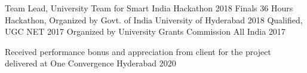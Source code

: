 \begin{cvhonors}
  \cvhonor
    {Team Lead, University Team for Smart India Hackathon 2018 Finals}
    {36 Hours Hackathon, Organized by Govt. of India}
    {University of Hyderabad}
    {2018}
  \cvhonor
    {Qualified, UGC NET 2017}
    {Organized by University Grants Commission}
    {All India}
    {2017}
\end{cvhonors}
\begin{cvhonors}
  \cvhonor
    {Received performance bonus and appreciation from client for the project delivered}
    {at One Convergence}
    {Hyderabad}
    {2020}
\end{cvhonors}
